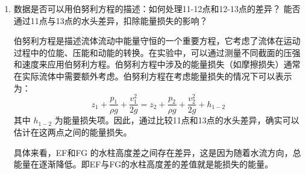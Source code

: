 \documentclass[dvipsnames, svgnames,a4paper,11pt]{article}
\begin{document}
\begin{enumerate}
		根据伯努利定理，流体在管道中的压力和速度满足以下方程：$p + \frac{1}{2}\rho V^2 = C$。其中，$p$ 是流体的压力，$\rho$ 是流体的密度，$V$ 是流体的速度，$C$ 是一个常数。在文丘里管的入口截面和最小截面处，分别取压点，测量水柱高度差，即：$\Delta h = h_1 - h_2$。其中，$h_1$ 是入口截面处的水柱高度，$h_2$ 是最小截面处的水柱高度。假设流体的密度为 $\rho$，水的密度为 $\rho_w$，重力加速度为 $g$，则水柱高度差与流体压力差的关系为：$\Delta p = \rho_w g \Delta h$。代入伯努利方程，得到：$\frac{1}{2}\rho V_1^2 - \frac{1}{2}\rho V_2^2 = \rho_w g \Delta h$。其中，$V_1$ 是入口截面处的流体速度，$V_2$ 是最小截面处的流体速度。如果假设流体是不可压缩的，即 $\rho$ 是一个常数，那么流体的流量 $Q$ 也是一个常数，即：$Q = A_1 V_1 = A_2 V_2$。其中，$A_1$ 是入口截面的面积，$A_2$ 是最小截面的面积。由此，可以解出：$V_1 = \frac{A_2}{A_1} V_2$。代入水柱高度差的方程，得到：$\Delta h = \frac{\rho}{2\rho_w g} \left( \frac{A_1^2 - A_2^2}{A_2^2} \right) V_2^2$。从这个方程可以看出，水柱高度差与最小截面处的流体速度的平方成正比（当地流速越大，水柱高度差越大；当地流速越小，水柱高度差越小）。同时，水柱高度差也与管道的入口截面和最小截面的面积有关入口截面越大（最小截面越小，水柱高度差越大；入口截面越小，最小截面越大，水柱高度差越小）。
		
		对比我们实验得到的结果：相邻水柱高度差与流量成平方关系，即相邻水柱高度差与当地流速成平方关系。		
		
		\item 数据是否可以用伯努利方程的描述：如何处理11-12点和12-13点的差异？
		能否通过11点与13点的水头差异，扣除能量损失的影响？	
		
		伯努利方程是描述流体流动中能量守恒的一个重要方程，它考虑了流体在运动过程中的位能、压能和动能的转换。在实验中，可以通过测量不同截面的压强和速度来应用伯努利方程。伯努利方程中涉及的能量损失（如摩擦损失）通常在实际流体中需要额外考虑。伯努利方程在考虑能量损失的情况下可以表示为：\[ z_1 + \frac{p_1}{\rho g} + \frac{v_1^2}{2g} = z_2 + \frac{p_2}{\rho g} + \frac{v_2^2}{2g} + h_{1-2} \] 其中 \( h_{1-2} \) 为能量损失项。因此，通过比较11点和13点的水头差异，确实可以估计在这两点之间的能量损失。
		
		具体来看，EF和FG 的水柱高度差之间存在差异，这是因为随着水流方向，总能量在逐渐降低。即EF与FG的水柱高度差的差值就是能损失的能量。	
	\end{enumerate}
	
\end{document}
